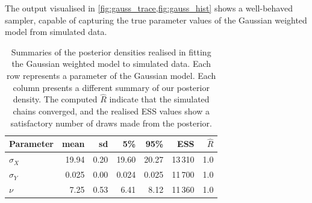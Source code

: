 The output visualised in \cref{fig:gauss_trace,fig:gauss_hist} shows a
well-behaved sampler, capable of capturing the true parameter values of the
Gaussian weighted model from simulated data.

\begin{table}[tbp]
  \begin{tabular}{@{}lrrrrrr@{}}
    \toprule
    Parameter    & mean  & sd   & 5\%   & 95\%  & ESS     & $\widehat{R}$ \\
    \midrule
    $\sigma_{X}$ & 19.94 & 0.20 & 19.60 & 20.27 & 13\,310 & 1.0           \\
    $\sigma_{Y}$ & 0.025 & 0.00 & 0.024 & 0.025 & 11\,700 & 1.0           \\
    $\nu$        & 7.25  & 0.53 & 6.41  & 8.12  & 11\,360 & 1.0           \\
    \bottomrule
  \end{tabular}
  \caption{Summaries of the posterior densities realised in fitting the
    Gaussian weighted model to simulated data. Each row represents a
    parameter of the Gaussian model. Each column presents a different summary
    of our posterior density. The computed $\widehat{R}$ indicate that the
    simulated chains converged, and the realised ESS values show a
    satisfactory number of draws made from the posterior.}
  \label{tab:gauss_summary}
\end{table}%
